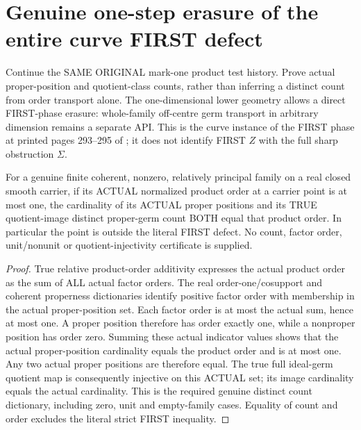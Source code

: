 \section{Genuine one-step erasure of the entire curve FIRST defect}

Continue the SAME ORIGINAL mark-one product test history. Prove actual
proper-position and quotient-class counts, rather than inferring a
distinct count from order transport alone. The one-dimensional lower
geometry allows a direct FIRST-phase erasure: whole-family off-centre
germ transport in arbitrary dimension remains a separate API. This is
the curve instance of the FIRST phase at printed pages 293--295 of
\cite{bierstone-milman97-invent-math}; it does not identify FIRST $Z$ with
the full sharp obstruction $\Sigma$.

\begin{lemma}
\label{hir:sharp-actual-product-order-le-one-true-count-dictionary}
\leanok
For a genuine finite coherent, nonzero, relatively principal family on a
real closed smooth carrier, if its ACTUAL normalized product order at a
carrier point is at most one, the cardinality of its ACTUAL proper
positions and its TRUE quotient-image distinct proper-germ count BOTH
equal that product order. In particular the point is outside the literal
FIRST defect. No count, factor order, unit/nonunit or quotient-injectivity
certificate is supplied.
\end{lemma}
\begin{proof}
True relative product-order additivity expresses the actual product order
as the sum of ALL actual factor orders. The real order-one/cosupport and
coherent properness dictionaries identify positive factor order with
membership in the actual proper-position set. Each factor order is at
most the actual sum, hence at most one. A proper position therefore has
order exactly one, while a nonproper position has order zero. Summing
these actual indicator values shows that the actual proper-position
cardinality equals the product order and is at most one. Any two actual
proper positions are therefore equal. The true full ideal-germ quotient
map is consequently injective on this ACTUAL set; its image cardinality
equals the actual cardinality. This is the required genuine distinct
count dictionary, including zero, unit and empty-family cases. Equality
of count and order excludes the literal strict FIRST inequality.
\end{proof}

